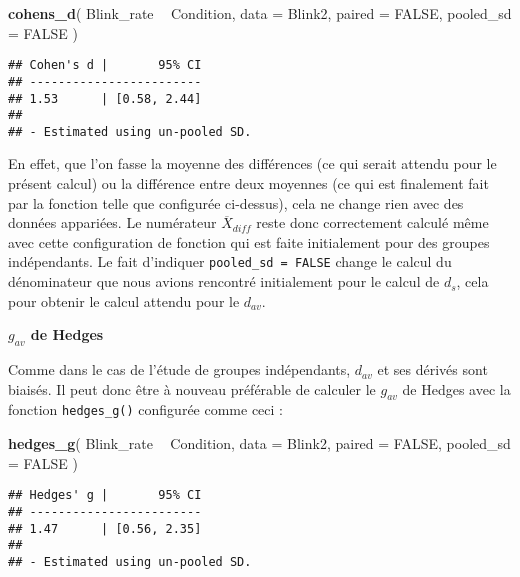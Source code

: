 \documentclass[
  french,
]{book}
\newenvironment{Shaded}{\begin{snugshade}}{\end{snugshade}}
\newcommand{\DataTypeTok}[1]{\textcolor[rgb]{0.13,0.29,0.53}{#1}}
\newcommand{\KeywordTok}[1]{\textcolor[rgb]{0.13,0.29,0.53}{\textbf{#1}}}
\newcommand{\NormalTok}[1]{#1}
\newcommand{\OperatorTok}[1]{\textcolor[rgb]{0.81,0.36,0.00}{\textbf{#1}}}
\newcommand{\OtherTok}[1]{\textcolor[rgb]{0.56,0.35,0.01}{#1}}
\newcommand{\StringTok}[1]{\textcolor[rgb]{0.31,0.60,0.02}{#1}}
\begin{document}
\begin{Shaded}
\begin{Highlighting}[]
\KeywordTok{cohens_d}\NormalTok{(}
\NormalTok{  Blink_rate }\OperatorTok{~}\StringTok{ }\NormalTok{Condition,}
  \DataTypeTok{data =}\NormalTok{ Blink2, }
  \DataTypeTok{paired =} \OtherTok{FALSE}\NormalTok{, }
  \DataTypeTok{pooled_sd =} \OtherTok{FALSE}
\NormalTok{  )}
\end{Highlighting}
\end{Shaded}

\begin{verbatim}
## Cohen's d |       95% CI
## ------------------------
## 1.53      | [0.58, 2.44]
## 
## - Estimated using un-pooled SD.
\end{verbatim}

En effet, que l'on fasse la moyenne des différences (ce qui serait attendu pour le présent calcul) ou la différence entre deux moyennes (ce qui est finalement fait par la fonction telle que configurée ci-dessus), cela ne change rien avec des données appariées. Le numérateur \(\overline{X} _{diff}\) reste donc correctement calculé même avec cette configuration de fonction qui est faite initialement pour des groupes indépendants. Le fait d'indiquer \texttt{pooled\_sd\ =\ FALSE} change le calcul du dénominateur que nous avions rencontré initialement pour le calcul de \(d_{s}\), cela pour obtenir le calcul attendu pour le \(d_{av}\).

\textbf{\(g_{av}\) de Hedges}

Comme dans le cas de l'étude de groupes indépendants, \(d_{av}\) et ses dérivés sont biaisés. Il peut donc être à nouveau préférable de calculer le \(g_{av}\) de Hedges avec la fonction \texttt{hedges\_g()} configurée comme ceci :

\begin{Shaded}
\begin{Highlighting}[]
\KeywordTok{hedges_g}\NormalTok{(}
\NormalTok{  Blink_rate }\OperatorTok{~}\StringTok{ }\NormalTok{Condition,}
  \DataTypeTok{data =}\NormalTok{ Blink2, }
  \DataTypeTok{paired =} \OtherTok{FALSE}\NormalTok{, }
  \DataTypeTok{pooled_sd =} \OtherTok{FALSE}
\NormalTok{  )}
\end{Highlighting}
\end{Shaded}

\begin{verbatim}
## Hedges' g |       95% CI
## ------------------------
## 1.47      | [0.56, 2.35]
## 
## - Estimated using un-pooled SD.
\end{verbatim}
\end{document}
